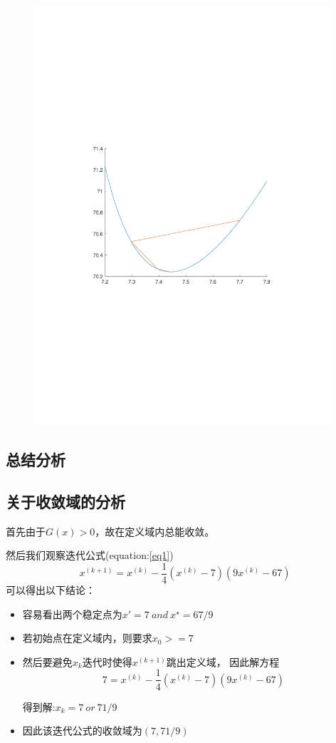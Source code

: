 \begin{figure}[H]
\centering
\includegraphics[width=11cm]{fig/2_3.pdf}
\end{figure}

\subsection{总结分析}
\subsection*{关于收敛域的分析}

首先由于$G(x)>0$，故在定义域内总能收敛。

然后我们观察迭代公式(equation:\ref{eq1})
\[x^{(k+1)}=x^{(k)}-\dfrac{1}{4}(x^{(k)}-7)(9x^{(k)}-67)\]
可以得出以下结论：
\begin{itemize}
\item
容易看出两个稳定点为$x'=7\ and\ x^{\star}=67/9$
\item
若初始点在定义域内，则要求$x_0>=7$
\item
然后要避免$x_k$迭代时使得$x^{(k+1)}$跳出定义域，
因此解方程
\[7=x^{(k)}-\dfrac{1}{4}(x^{(k)}-7)(9x^{(k)}-67)\]

得到解:$x_k=7\ or \ 71/9$
\item
因此该迭代公式的收敛域为$(7,71/9)$
\end{itemize}

